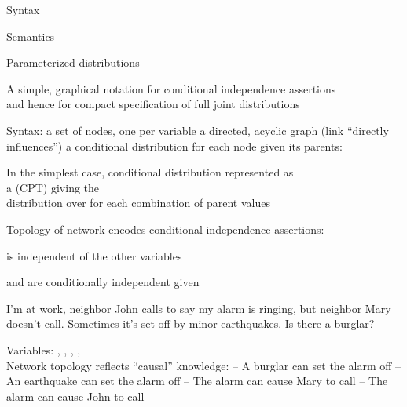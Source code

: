 \documentclass{article}
\begin{document}
\begin{huge}

\sf


\blob Syntax

\blob Semantics

\blob Parameterized distributions




A simple, graphical notation for conditional independence assertions\\
and hence for compact specification of full joint distributions

Syntax:\al
  a set of nodes, one per variable\al
  a directed, acyclic graph (link \mat{$\approx$} ``directly influences'')\al
  a conditional distribution for each node given its parents:\nl

In the simplest case, conditional distribution represented as\\
a  (CPT) giving the\\
distribution over  for each combination of parent values


Topology of network encodes conditional independence assertions:

\vspace*{0.3in}

\textwidth
{}

 is independent of the other variables

 and  are conditionally independent given 



I'm at work, neighbor John calls to say my alarm is ringing, but
neighbor Mary doesn't call. Sometimes it's set off by minor
earthquakes. Is there a burglar?

Variables: , , , , \\
Network topology reflects ``causal'' knowledge:\al
 -- A burglar can set the alarm off\al
 -- An earthquake can set the alarm off\al
 -- The alarm can cause Mary to call\al
 -- The alarm can cause John to call


\end{huge}
\end{document}
